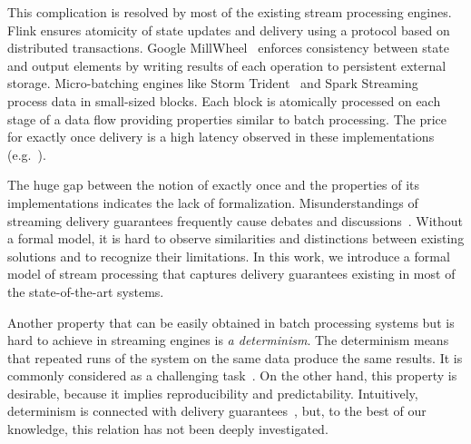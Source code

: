 This complication is resolved  by most of the existing stream processing engines. 
Flink ensures atomicity of  state updates and   delivery using a protocol based on distributed transactions. 
Google MillWheel~\cite{Akidau:2013:MFS:2536222.2536229} enforces consistency between state and output elements by writing results of each operation to persistent external storage. 
Micro-batching engines like Storm Trident~\cite{apache:storm:trident} and Spark Streaming~\cite{Zaharia:2012:DSE:2342763.2342773} process data in small-sized blocks. 
Each block is atomically processed on each stage of a data flow  providing properties similar to batch processing. 
The price for exactly once delivery is a high latency  observed in these implementations (e.g.~\cite{7530084, 7474816}).


The huge gap between the notion of exactly once and the properties of its implementations indicates the lack of formalization. 
Misunderstandings of streaming delivery guarantees frequently cause debates and discussions~\cite{JerryPengStreamIO, PaperTrail}. Without a formal model, it is hard to observe similarities and distinctions between existing solutions and to recognize their limitations. In this work, we introduce a formal model of stream processing that captures delivery guarantees existing in most of the state-of-the-art systems.

Another property that can be easily obtained in batch processing systems but is hard to achieve in streaming engines is {\em a determinism}. 
The determinism means that repeated runs of the system on the same data produce the same results. It is commonly considered as a challenging task~\cite{Zacheilas:2017:MDS:3093742.3093921}. On the other hand, this property is desirable, because it implies reproducibility and predictability. Intuitively, determinism is connected with delivery guarantees~\cite{Stonebraker:2005:RRS:1107499.1107504}, but, to the best of our knowledge, this relation has not been deeply investigated. 


